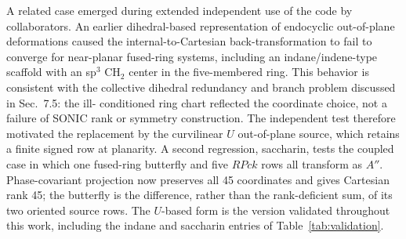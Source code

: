 \documentclass[journal=jctcce,manuscript=article,layout=traditional]{achemso}
\theoremstyle{definition}
\begin{document}
A related case emerged during extended independent use of the code by
collaborators.  An earlier dihedral-based representation of endocyclic
out-of-plane deformations caused the internal-to-Cartesian
back-transformation to fail to converge for near-planar fused-ring systems,
including an indane/indene-type scaffold with an sp\(^3\) CH\(_2\) center in
the five-membered ring.  This behavior is consistent with the collective
dihedral redundancy and branch problem discussed in Sec.~7.5: the ill-
conditioned ring chart reflected the coordinate choice, not a failure of
SONIC rank or symmetry construction.  The independent test therefore
motivated the replacement by the curvilinear \(U\) out-of-plane source, which
retains a finite signed row at planarity.  A second regression, saccharin,
tests the coupled case in which one fused-ring butterfly and five \(RPck\)
rows all transform as \(A''\).  Phase-covariant projection now preserves all
45 coordinates and gives Cartesian rank 45; the butterfly is the difference,
rather than the rank-deficient sum, of its two oriented source rows.  The
\(U\)-based form is the version validated throughout this work, including the
indane and saccharin entries of Table~\ref{tab:validation}.
\end{document}
